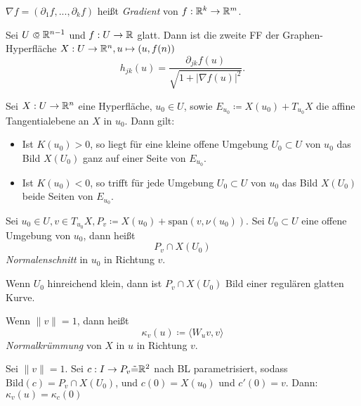 \documentclass{cheat-sheet}
\newcommand{\Span}{\mathrm{span}}
\newcommand{\Bild}{\mathrm{Bild}}
\begin{document}
\begin{nota}
  $\nabla f = (\partial_1 f, ..., \partial_k f)$ heißt \emph{Gradient} von $f : \mathbb{R}^k \to \mathbb{R}^m$.
\end{nota}

\begin{satz}
  Sei $U \opn \R^{n-1}$ und $f : U \to \mathbb{R}$ glatt. Dann ist die zweite FF der Graphen-Hyperfläche $X : U \to \mathbb{R}^n, u \mapsto (u, f(n))$
  \[ h_{jk}(u) = \frac{\partial_{jk} f(u)}{\sqrt{1 + |\nabla f(u)|^2}}. \]
\end{satz}

\begin{satz}
  Sei $X : U \to \mathbb{R}^n$ eine Hyperfläche, $u_0 \in U$, sowie $E_{u_0} \coloneqq X(u_0) + T_{u_0} X$ die affine Tangentialebene an $X$ in $u_0$. Dann gilt:
  \begin{itemize}
    \item Ist $K(u_0) > 0$, so liegt für eine kleine offene Umgebung $U_0 \subset U$ von $u_0$ das Bild $X(U_0)$ ganz auf einer Seite von $E_{u_0}$.
    \item Ist $K(u_0) < 0$, so trifft für jede Umgebung $U_0 \subset U$ von $u_0$ das Bild $X(U_0)$ beide Seiten von $E_{u_0}$.
  \end{itemize}
\end{satz}


\begin{defn}
  Sei $u_0 \in U, v \in T_{u_0} X, P_v \coloneqq X(u_0) + \Span(v, \nu(u_0))$.
  Sei $U_0 \subset U$ eine offene Umgebung von $u_0$, dann heißt
  \[ P_v \cap X(U_0) \]
  \emph{Normalenschnitt} in $u_0$ in Richtung $v$.
\end{defn}

\begin{satz}
  Wenn $U_0$ hinreichend klein, dann ist $P_v \cap X(U_0)$ Bild einer regulären glatten Kurve.
\end{satz}

\begin{defn}
  Wenn $\| v \| = 1$, dann heißt
  \[ \kappa_v(u) \coloneqq \langle W_u v, v \rangle \]
  \emph{Normalkrümmung} von $X$ in $u$ in Richtung $v$.
\end{defn}

\begin{bem}
  Sei $\|v\| = 1$. Sei $c : I \to P_v \tilde{=} \mathbb{R}^2$ nach BL parametrisiert, sodass $\Bild(c) = P_v \cap X(U_0)$, und $c(0) = X(u_0)$ und $c'(0) = v$. Dann: $\kappa_v(u) = \kappa_c(0)$
\end{bem}
\end{document}
